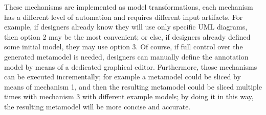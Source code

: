 %
These mechanisms are implemented as model transformations, each mechanism has a different level of automation and requires different input artifacts.
For example, if designers already know they will use only specific UML diagrams, then option 2 may be the most convenient;
or else, if designers already defined some initial model, they may use option 3.
Of course, if full control over the generated metamodel is needed, designers can manually define the annotation model by means of a dedicated graphical editor.
Furthermore, those mechanisms can be executed incrementally; for example a metamodel could be sliced by means of 
mechanism 1, and then the resulting metamodel could be sliced multiple times with mechanism 3 with different example models;
by doing it in this way, the resulting metamodel will be more concise and accurate. 

